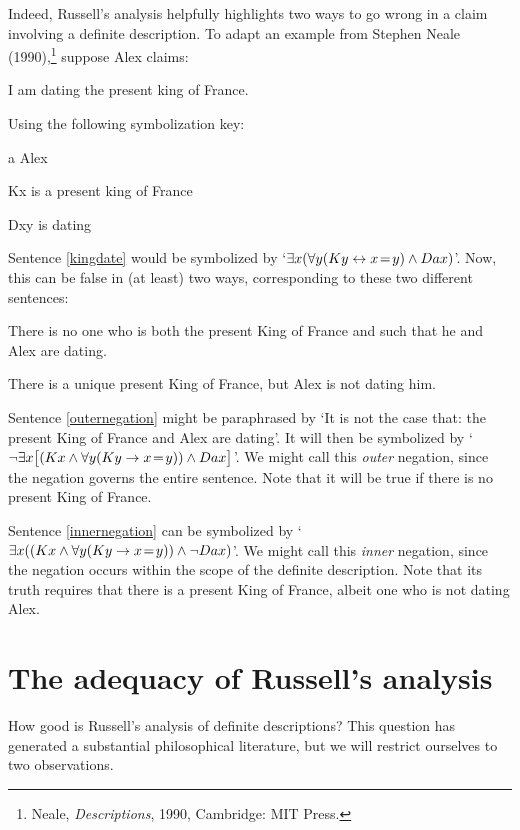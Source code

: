 Indeed, Russell's analysis helpfully highlights two ways to go wrong in a claim involving a definite description. To adapt an example from Stephen Neale (1990),\footnote{Neale, \emph{Descriptions}, 1990, Cambridge: MIT Press.}  suppose Alex claims:
	\begin{earg}
		\item[\ex{kingdate}] I am dating the present king of France.
	\end{earg}
Using the following symbolization key:
	\begin{ekey}
		\item[a] Alex
		\item[Kx]  is a present king of France
		\item[Dxy]  is dating 
	\end{ekey}
Sentence \ref{kingdate} would be symbolized by `$\exists x (\forall y(Ky \leftrightarrow  x \!=\! y) \wedge Dax)$'. Now, this can be false in (at least) two ways, corresponding to these two different sentences:
	\begin{earg}
		\item[\ex{outernegation}] There is no one who is both the present King of France and  such that he and Alex are dating.
		\item[\ex{innernegation}] There is a unique present King of France, but Alex is not dating him.
	\end{earg}
Sentence \ref{outernegation} might be paraphrased by `It is not the case that: the present King of France and Alex are dating'. It will then be symbolized by `$\neg \exists x\bigl[(Kx \wedge \forall y(Ky \rightarrow  x \!=\! y)) \wedge Dax \bigr]$'. We might call this \emph{outer} negation, since the negation governs the entire sentence. Note that it will be true if there is no present King of France.

Sentence \ref{innernegation} can be symbolized by `$\exists x ((Kx \wedge \forall y(Ky \rightarrow x \!=\! y)) \wedge \neg Dax)$'. We might call this \emph{inner} negation, since the negation occurs within the scope of the definite description. Note that its truth requires that there is a present King of France, albeit one who is not dating Alex.

\section{The adequacy of Russell's analysis}
How good is Russell's analysis of definite descriptions? This question has generated a substantial philosophical literature, but we will restrict ourselves to two observations.

